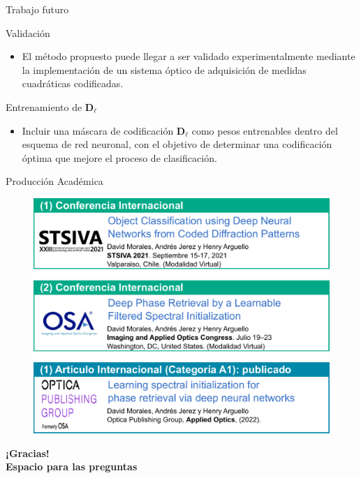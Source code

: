 \documentclass[aspectratio=169,t,xcolor=table]{beamer}
\begin{document}
\begin{frame}{Trabajo futuro}
    \scriptsize
    \begin{block}{\scriptsize Validación}
        \begin{itemize}
            \item El método propuesto puede llegar a ser validado experimentalmente mediante la implementación de un sistema óptico de adquisición de medidas cuadráticas codificadas. 
            \end{itemize}
    \end{block}        
    \begin{block}{\scriptsize Entrenamiento de $\mathbf{D}_\ell$}
        \begin{itemize}
            \item Incluir una máscara de codificación $\mathbf{D}_\ell$ como pesos entrenables dentro del esquema de red neuronal, con el objetivo de determinar una codificación óptima que mejore el proceso de clasificación.
        \end{itemize}
    \end{block}
        
\end{frame}

\begin{frame}{Producción Académica}
    \begin{figure}
        \centering
        \includegraphics[height=0.75\textheight]{images/productos_tesis.pdf}
    \end{figure}
\end{frame}




\begin{frame}
    \centering
    \vspace{3cm}
    \textbf{\Huge ¡Gracias!}
    \ \\
    \textbf{Espacio para las preguntas}
    \ \\
    
\end{frame}
\end{document}
